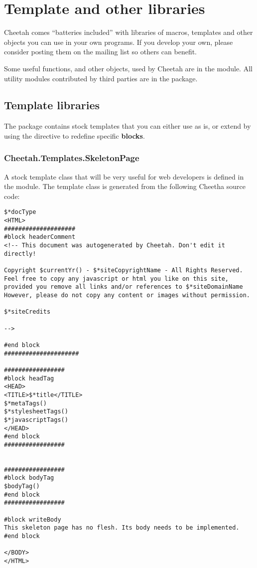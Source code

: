 \section{Template and other libraries}
\label{libraries}

Cheetah comes ``batteries included'' with libraries of macros, templates and
other objects you can use in your own programs. If you develop your own, please
consider posting them on the mailing list so others can benefit. 

Some useful functions, and other objects, used by Cheetah are in the
 module.  All utility modules contributed by third
parties are in the  package.

\subsection{Template libraries}
\label{libraries.templates}

The  package contains stock templates that you can
either use as is, or extend by using the  directive to redefine
specific {\bf blocks}.

\subsubsection{Cheetah.Templates.SkeletonPage}
\label{libraries.templates.skeletonPage}

A stock template class that will be very useful for web developers is defined in
the  module.  The 
template class is generated from the following Cheetha source code:

\begin{verbatim}
$*docType
<HTML>
####################
#block headerComment
<!-- This document was autogenerated by Cheetah. Don't edit it directly!

Copyright $currentYr() - $*siteCopyrightName - All Rights Reserved.
Feel free to copy any javascript or html you like on this site,
provided you remove all links and/or references to $*siteDomainName
However, please do not copy any content or images without permission.

$*siteCredits

-->

#end block 
#####################

#################
#block headTag
<HEAD>
<TITLE>$*title</TITLE>
$*metaTags()
$*stylesheetTags()
$*javascriptTags()
</HEAD>
#end block 
#################


#################
#block bodyTag
$bodyTag()
#end block 
#################

#block writeBody
This skeleton page has no flesh. Its body needs to be implemented.
#end block 

</BODY>
</HTML>
\end{verbatim}

